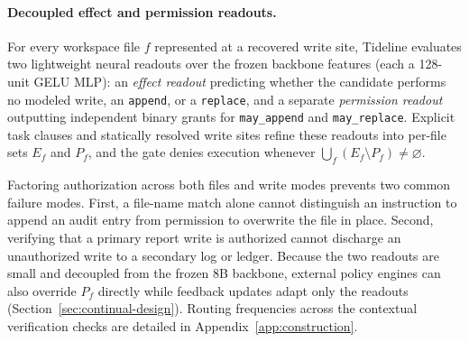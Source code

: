 \paragraph{Decoupled effect and permission readouts.}
For every workspace file $f$ represented at a recovered write site, Tideline evaluates two lightweight neural readouts over the frozen backbone features (each a 128-unit GELU MLP): an \emph{effect readout} predicting whether the candidate performs no modeled write, an \texttt{append}, or a \texttt{replace}, and a separate \emph{permission readout} outputting independent binary grants for \texttt{may\_append} and \texttt{may\_replace}. Explicit task clauses and statically resolved write sites refine these readouts into per-file sets $E_f$ and $P_f$, and the gate denies execution whenever $\bigcup_f (E_f \setminus P_f) \neq \varnothing$.

Factoring authorization across both files and write modes prevents two common failure modes. First, a file-name match alone cannot distinguish an instruction to append an audit entry from permission to overwrite the file in place. Second, verifying that a primary report write is authorized cannot discharge an unauthorized write to a secondary log or ledger. Because the two readouts are small and decoupled from the frozen 8B backbone, external policy engines can also override $P_f$ directly while feedback updates adapt only the readouts (Section~\ref{sec:continual-design}). Routing frequencies across the contextual verification checks are detailed in Appendix~\ref{app:construction}.
